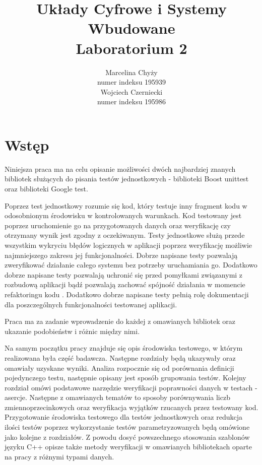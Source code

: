 \documentclass[12pt,a4paper,notitlepage]{report}
\author{Marcelina Chyży\\numer indeksu 195939\\Wojciech Czerniecki\\numer indeksu 195986}
\title{Układy Cyfrowe i Systemy Wbudowane \\ \small Laboratorium 2}
\makeatletter
\newcommand{\linia}{\rule{\linewidth}{0.4mm}}
\renewcommand{\maketitle}{
	\begin{titlepage}
		\vspace*{1cm}
		\begin{center}\small
			Politechnika Wrocławksa\\
			Wydział Elektorniki
		\end{center}
		\vspace{3cm}
		\noindent
		\linia
		\begin{center}
			\LARGE \textsc{\@title}
		\end{center}
		\linia
		\vspace{5.5cm}
		\begin{flushright}
			\begin{minipage}{5cm}
				\textit{\small Autorzy:}\\
				\normalsize \textsc{\@author} \par
			\end{minipage}
		\end{flushright}
		\vspace*{\stretch{6}}
		\begin{center}
			\@date
		\end{center}
	\end{titlepage}%
}
\makeatother
\begin{document}
	
	
	\newpage\thispagestyle{empty}
	\mbox{}
	
	\tableofcontents
	
	\renewcommand*\sectionmark[1]{\markboth{#1}{}}
	\renewcommand*\subsectionmark[1]{\markright{#1}}
	

\chapter{Wstęp}

Niniejsza praca ma na celu opisanie możliwości dwóch najbardziej znanych bibliotek służących do pisania testów jednostkowych - biblioteki Boost unittest oraz biblioteki Google test.

Poprzez test jednostkowy rozumie się kod, który testuje inny fragment kodu w odosobnionym środowisku w kontrolowanych warunkach. Kod testowany jest poprzez uruchomienie go na przygotowanych danych oraz weryfikację czy otrzymany wynik jest zgodny z oczekiwanym. Testy jednostkowe służą przede wszystkim wykryciu błędów logicznych w aplikacji poprzez weryfikację możliwie najmniejszego zakresu jej funkcjonalności. Dobrze napisane testy pozwalają zweryfikować działanie całego systemu bez potrzeby uruchamiania go. Dodatkowo dobrze napisane testy pozwalają uchronić się przed pomyłkami związanymi z rozbudową aplikacji bądź pozwalają zachować spójność działania w momencie refaktoringu kodu \cite{devstyle}. Dodatkowo dobrze napisane testy pełnią rolę dokumentacji dla poszczególnych funkcjonalności testowanej aplikacji.

Praca ma za zadanie wprowadzenie do każdej z omawianych bibliotek oraz ukazanie podobieństw i różnic między nimi.

Na samym początku pracy znajduje się opis środowiska testowego, w którym realizowana była część badawcza. Następne rozdziały będą ukazywały oraz omawiały uzyskane wyniki. Analiza rozpocznie się od porównania definicji pojedynczego testu, następnie opisany jest sposób grupowania testów. Kolejny rozdział omówi podstawowe narzędzie weryfikacji poprawności danych w testach - asercje. Następne z omawianych tematów to sposoby porównywania liczb zmiennoprzecinkowych oraz weryfikacja wyjątków rzucanych przez testowany kod. Przygotowanie środowiska testowego dla testów jednostkowych oraz redukcja ilości testów poprzez wykorzystanie testów parametryzowanych będą omówione jako kolejne z rozdziałów. Z powodu dosyć powszechnego stosowania szablonów języku C++ opisze także metody weryfikacji w omawianych bibliotekach oparte na pracy z różnymi typami danych.
\end{document}
